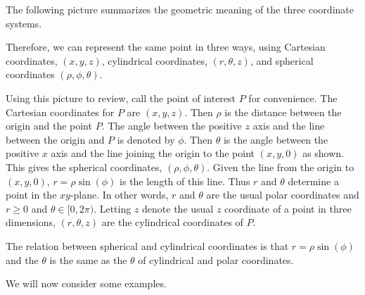The following picture summarizes the geometric meaning of the three coordinate systems.

\begin{center}
\end{center}

Therefore, we can represent the same point in three ways, using Cartesian coordinates, $(x,y,z)$, cylindrical coordinates, $(r, \theta, z)$, and spherical coordinates $(\rho, \phi, \theta)$.

Using this picture to review, call the point of interest $P$ for convenience. The Cartesian coordinates for $P$ are $(x,y,z)$. Then $\rho $ is the distance between the origin and the point $P$. The angle between
the positive $z$ axis and the line between the origin and $P$
 is denoted by $\phi$. Then $\theta $ is the angle
between the positive $x$ axis and the line joining the origin to the point
$(x,y,0) $ as shown. This gives the spherical coordinates, $( \rho, \phi, \theta)$. Given the line from the origin to $(x,y,0)$,  $r=\rho \sin(\phi)$ is the length of this
line. Thus $r$ and $\theta $ determine a point in the $xy$-plane. In other words, $r$ and $\theta $ are the usual polar coordinates and $r\geq 0$ and $\theta \in \lbrack 0,2\pi )$. Letting $z$ denote the usual
$z$ coordinate of a point in three dimensions,
$(r,\theta ,z) $ are the cylindrical coordinates of $P$.

The relation between spherical and cylindrical coordinates is that $r=\rho
\sin(\phi)$ and the $\theta$ is the same as the $\theta$ of cylindrical and polar
coordinates.

We will now consider some examples.


